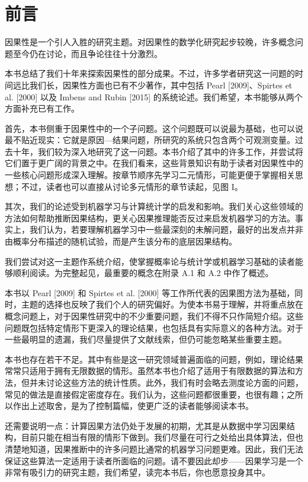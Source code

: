 \chapter*{前言}

因果性是一个引人入胜的研究主题。对因果性的数学化研究起步较晚，许多概念问题至今仍在讨论，而且争论往往十分激烈。

本书总结了我们十年来探索因果性的部分成果。不过，许多学者研究这一问题的时间远比我们长，因果性方面也已有不少著作，其中包括 Pearl [2009]、Spirtes et al. [2000] 以及 Imbens and Rubin [2015] 的系统论述。我们希望，本书能够从两个方面补充已有工作。

首先，本书侧重于因果性中的一个子问题。这个问题既可以说最为基础，也可以说最不贴近现实：它就是原因—结果问题，所研究的系统只包含两个可观测变量。过去十年，我们较为深入地研究了这一问题。本书介绍了其中的许多工作，并尝试将它们置于更广阔的背景之中。在我们看来，这些背景知识有助于读者对因果性中的一些核心问题形成深入理解。按章节顺序先学习二元情形，可能更便于掌握相关思想；不过，读者也可以直接从讨论多元情形的章节读起，见图 I。

其次，我们的论述受到机器学习与计算统计学的启发和影响。我们关心这些领域的方法如何帮助推断因果结构，更关心因果推理能否反过来启发机器学习的方法。事实上，我们认为，若要理解机器学习中一些最深刻的未解问题，最好的出发点并非由概率分布描述的随机试验，而是产生该分布的底层因果结构。

我们尝试对这一主题作系统介绍，使掌握概率论与统计学或机器学习基础的读者能够顺利阅读。为完整起见，最重要的概念在附录 A.1 和 A.2 中作了概述。

本书以 Pearl [2009] 和 Spirtes et al. [2000] 等工作所代表的因果图方法为基础，同时，主题的选择也反映了我们个人的研究偏好。为使本书易于理解，并将重点放在概念问题上，对于因果性研究中的不少重要问题，我们不得不只作简短介绍。这些问题既包括特定情形下更深入的理论结果，也包括具有实际意义的各种方法。对于一些最明显的遗漏，我们尽量提供了文献线索，但仍可能忽略某些重要主题。

本书也存在若干不足。其中有些是这一研究领域普遍面临的问题，例如，理论结果常常只适用于拥有无限数据的情形。虽然本书也介绍了适用于有限数据的算法和方法，但并未讨论这些方法的统计性质。此外，我们有时会略去测度论方面的问题，常见的做法是直接假定密度存在。我们认为，这些问题都很重要，也很有趣；之所以作出上述取舍，是为了控制篇幅，使更广泛的读者能够阅读本书。

还需要说明一点：计算因果方法仍处于发展的初期，尤其是从数据中学习因果结构，目前只能在相当有限的情形下做到。我们尽量在可行之处给出具体算法，但也清楚地知道，因果推断中的许多问题比通常的机器学习问题更难。因此，我们无法保证这些算法一定适用于读者所面临的问题。请不要因此却步——因果学习是一个非常有吸引力的研究主题，我们希望，读完本书后，你也愿意投身其中。

